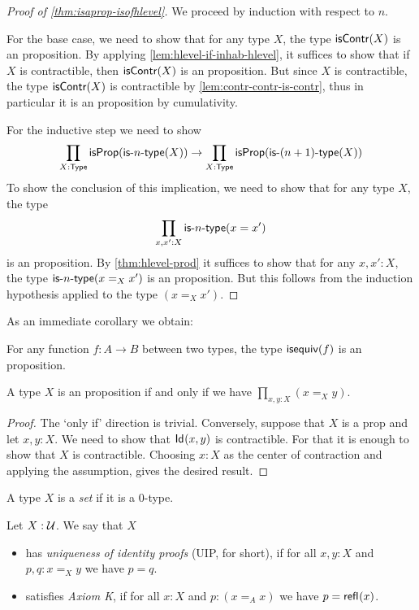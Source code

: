 \begin{proof}[Proof of \autoref{thm:isaprop-isofhlevel}]
  We proceed by induction with respect to $n$.

 For the base case, we need to show that for any type $X$, the type $\mathsf{isContr}(X)$ is an
        proposition. By applying \autoref{lem:hlevel-if-inhab-hlevel}, it suffices to show that
        if $X$ is contractible, then $\mathsf{isContr}(X)$ is an proposition.
        But since $X$ is contractible, the type $\mathsf{isContr}(X)$ is contractible by \autoref{lem:contr-contr-is-contr},
          thus in particular it is an proposition by cumulativity.

For the inductive step we need to show
\[\prod_{X : \mathsf{Type}} \mathsf{isProp} (\mathsf{is}\mbox{-}{n}\mbox{-}\mathsf{type}(X)) \to \prod_{X : \mathsf{Type}} \mathsf{isProp} (\mathsf{is}\mbox{-}{(n+1)}\mbox{-}\mathsf{type}(X)) \]
To show the conclusion of this implication, we need to show that for any type $X$, the type
    \[\prod_{x, x' : X}\mathsf{is}\mbox{-}{n}\mbox{-}\mathsf{type}(x = x')\]
is an proposition. By \autoref{thm:hlevel-prod} it suffices to show that for any $x, x' : X$, the type $\mathsf{is}\mbox{-}{n}\mbox{-}\mathsf{type}(x =_X x')$ is an proposition.
But this follows from the induction hypothesis applied to the type $(x =_X x')$.
\end{proof}

As an immediate corollary we obtain:

\begin{cor}
 For any function $f \colon A \to B$ between two types, the type $\mathsf{isequiv}(f)$ is an proposition.
\end{cor}

\begin{thm}
 A type $X$ is an proposition if and only if we have $\prod\limits_{x, y : X} (x =_X y)$.
\end{thm}

\begin{proof}
 The `only if' direction is trivial. Conversely, suppose that $X$ is a prop and let $x, y : X$. We need to show that $\mathsf{Id}_{}(x,y)$ is contractible. For that it is enough to show that $X$ is contractible. Choosing $x : X$ as the center of contraction and applying the assumption, gives the desired result.
\end{proof}

\begin{defn}\label{defn:h-set}
 A type $X$ is a {\em set} if it is a $0$-type.
\end{defn}

\begin{defn}
 Let $X : \mathcal{U}$. We say that $X$
 \begin{itemize}
  \item has {\em uniqueness of identity proofs} (UIP, for short), if for all $x, y : X$ and $p, q : x =_X y$ we have $p = q$.
  \item satisfies {\em Axiom K}, if for all $x : X$ and $p : (x =_A x)$ we have $p = \mathsf{refl}_{}(x)$.
 \end{itemize}
\end{defn}

